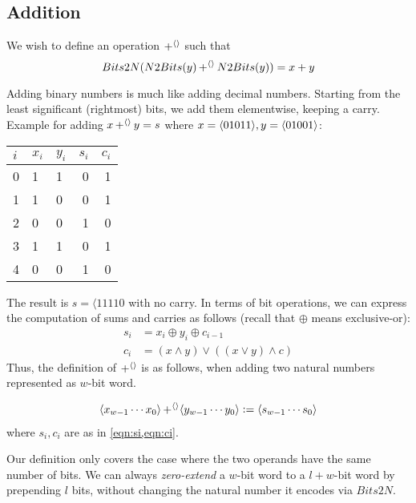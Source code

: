 \subsection{Addition}
\label{sec:bit-addition}

We wish to define an operation $\operatorname{+^{\langle\rangle}}$ such that
\begin{equation}
  Bits2N(N2Bits(y)\operatorname{+^{\langle\rangle}}{}N2Bits(y)) = x + y
\end{equation}

Adding binary numbers is much like adding decimal numbers.  Starting
from the least significant (rightmost) bits, we add them elementwise,
keeping a carry.  Example for adding $x\operatorname{+^{\langle\rangle}}{} y=s$ where
$x=\langle 01011 \rangle, y=\langle 01001 \rangle$:

\begin{center}
\begin{tabular}{l|llrr}
  $i$ & $x_{i}$ & $y_{i}$ & $s_{i}$ & $c_{i}$ \\\hline
  0 & 1 & 1 & 0 & 1 \\
  1 & 1 & 0 & 0 & 1 \\
  2 & 0 & 0 & 1 & 0 \\
  3 & 1 & 1 & 0 & 1 \\
  4 & 0 & 0 & 1 & 0
\end{tabular}
\end{center}

The result is $s=\langle{11110}$ with no carry.  In terms of bit
operations, we can express the computation of sums and carries as
follows (recall that $\oplus$ means exclusive-or):
\begin{align}
  s_{i} &= x_{i} \oplus y_{i} \oplus c_{i-1} \label{eqn:si} \\
  c_{i} &= (x\land{}y)\lor{}((x\lor{}y)\land{}c) \label{eqn:ci}
\end{align}
Thus, the definition of $\operatorname{+^{\langle\rangle}}$ is as follows, when adding two
natural numbers represented as $w$-bit word.
\begin{definition}
\begin{align*}
  \langle x_{w-1}\cdots{}x_{0} \rangle \operatorname{+^{\langle\rangle}} \langle y_{w-1}\cdots{}y_{0} \rangle \vcentcolon=
  \langle s_{w-1}\cdots{}s_{0} \rangle
\end{align*}
where $s_{i},c_{i}$ are as in \cref{eqn:si,eqn:ci}.
\end{definition}

Our definition only covers the case where the two operands have the
same number of bits.  We can always \emph{zero-extend} a $w$-bit word
to a $l+w$-bit word by prepending $l$ bits, without changing the
natural number it encodes via $Bits2N$.

